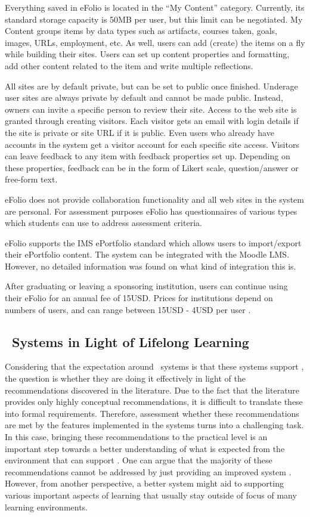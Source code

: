 Everything saved in eFolio is located in the ``My Content'' category. Currently,
its standard storage capacity is 50MB per user, but this limit can be
negotiated. My Content groups items by data types such as artifacts, courses
taken, goals, images, URLs, employment, etc. As well, users can add (create) the
items on a fly while building their sites. Users can set up content properties
and formatting, add other content related to the item and write multiple
reflections.

All sites are by default private, but can be set to public once finished.
Underage user sites are always private by default and cannot be made public.
Instead, owners can invite a specific person to review their site. Access to the
web site is granted through creating visitors. Each visitor gets an email with
login details if the site is private or site URL if it is public. Even users who
already have accounts in the system get a visitor account for each specific site
access. Visitors can leave feedback to any item with feedback properties set up.
Depending on these properties, feedback can be in the form of Likert scale,
question/answer or free-form text.

eFolio does not provide collaboration functionality and all web sites in the
system are personal. For assessment purposes eFolio has questionnaires of
various types which students can use to address assessment criteria.

eFolio supports the IMS ePortfolio standard which allows users to import/export
their ePortfolio content. The system can be integrated with the Moodle LMS.
However, no detailed information was found on what kind of integration this is.

After graduating or leaving a sponsoring institution, users can continue
using their eFolio for an annual fee of 15USD. Prices for institutions depend
on numbers of users, and can range between 15USD - 4USD per user
\citep{AAEEBL2011}.

\subsection{\ep~Systems in Light of Lifelong Learning}

Considering that the expectation around \ep~systems is that these systems
support \LLLsn, the question is whether they are doing it effectively in light
of the recommendations discovered in the literature. Due to the fact that the
literature provides only highly conceptual recommendations, it is difficult to
translate these into formal requirements. Therefore, assessment whether these
recommendations are met by the features implemented in the systems turns into a
challenging task. In this case, bringing these recommendations to the practical
level is an important step towards a better understanding of what is expected
from the environment that can support \LLLsn. One can argue that the majority of
these recommendations cannot be addressed by just providing an improved system
\citep{Schaffert2008}. However, from another perspective, a better system might
aid to supporting various important aspects of learning that usually stay
outside of focus of many learning environments.

